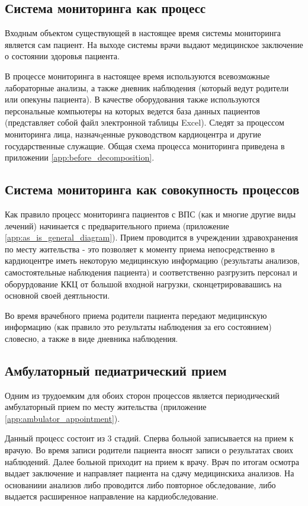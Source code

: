 \subsection{Система мониторинга как процесс}

Входным объектом существующей в настоящее время системы мониторинга является сам
пациент. На выходе системы врачи выдают медицинское заключение о состоянии
здоровья пациента.

В процессе мониторинга в настоящее время используются всевозможные лабораторные
анализы, а также дневник наблюдения (который ведут родители или опекуны
пациента). В качестве оборудования также используются персональные компьютеры на
которых ведется база данных пациентов (представляет собой файл электронной
таблицы Excel). Следят за процессом мониторинга лица, назначqенные руководством
кардиоцентра и другие государственные служащие. Общая схема процесса мониторинга
приведена в приложении \ref{app:before_decomposition}.

\subsection{Система мониторинга как совокупность процессов}

Как правило процесс мониторинга пациентов с ВПС (как и многие другие виды
лечений) начинается с предварительного приема (приложение
\ref{app:as_is_general_diagram}). Прием проводится в учреждении здравохранения
по месту жительства - это позволяет к моменту приема непосредственно в кардиоцентре  иметь некоторую медицинскую информацию
(результаты анализов, самостоятельные наблюдения пациента) и соответственно
разгрузить персонал и оборурдование ККЦ от большой входной нагрузки,
сконцетрировавашись на основной своей деятльности.

Во время врачебного приема родители пациента передают медицинскую информацию
(как правило это результаты наблюдения за его состоянием) словесно, а также  в
виде дневника наблюдения.

\subsection{Амбулаторный педиатрический прием}

Одним из трудоемким для обоих сторон процессов является периодический
амбулаторный прием по месту жительства (приложение
\ref{app:ambulator_appointment}).

Данный процесс состоит из 3 стадий. Сперва больной записывается на прием к
врачую. Во время записи родители пациента вносят записи о результатах своих
наблюдений. Далее больной приходит на прием к врачу. Врач по итогам осмотра
выдает заключение и направляет пациента на сдачу медицинскиха анализов. На
основаниии анализов либо проводится либо повторное обследование, либо выдается
расширенное направление на кардиобследование.

